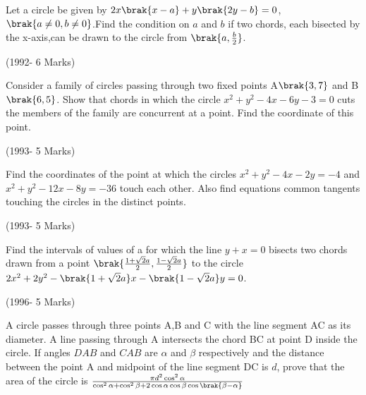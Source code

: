 \iffalse
  \title{Assignment1 EE24BTECH11025}
  \author{GEEDI HARSHA VARDHAN}
  \section{subjective}
\fi


    
	\item Let a circle be given by $2x\brak{x-a}+y\brak{2y-b}=0$,$\brak{a\neq0,b\neq0}$.Find the condition on $a$ and $b$ if two chords, each bisected by the x-axis,can be drawn to the circle from $\brak{a,\frac{b}{2}}$.                         

\hfill(1992- 6 Marks)\\




\item Consider a family of circles passing through two fixed points A$\brak{3,7}$ and B$\brak{6,5}$. Show that chords in which the circle $x^2+y^2-4x-6y-3=0$ cuts the members of the family are concurrent at a point. Find the coordinate of this point.
	        
\hfill(1993- 5 Marks)\\





\item Find the coordinates of the point at which the circles $x^2+y^2-4x-2y=-4$ and $x^2+y^2-12x-8y=-36$ touch each other. Also find equations common tangents touching the circles in the distinct points.                        

\hfill(1993- 5 Marks)\\


\item Find the intervals of values of a for which the line $y+x=0$ bisects two chords drawn from a point $\brak {\frac{1+\sqrt{2}a}{2},\frac{1-\sqrt{2}a}{2}}$ to the circle $2x^2+2y^2-\brak{1+\sqrt{2}a}x-\brak{1-\sqrt{2}a}y=0$.  

\hfill(1996- 5 Marks)\\





\item A circle passes through three points A,B and C with the line segment AC as its diameter. A line passing through A intersects the chord BC at point D inside the circle. If angles $DAB$ and $CAB$ are $\alpha$ and $\beta$ respectively and the distance between the point A and midpoint of the line segment DC is $d$, prove that the area of the circle is $\frac{\pi d^2 \cos^2{\alpha} }{\cos^2{\alpha}+\cos^2{\beta}+ 2\cos{\alpha} \cos{\beta} \cos{\brak{\beta-\alpha}}}$                

